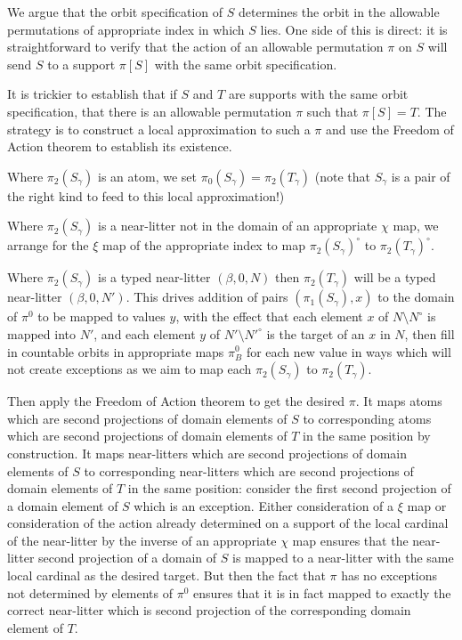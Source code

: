 \documentclass[12pt]{article}
\begin{document}
We argue that the orbit specification of $S$ determines the orbit in the allowable permutations of appropriate index in which $S$ lies.  One side of this is direct:  it is straightforward to verify that the action of an allowable permutation $\pi$ on $S$ will send $S$ to a support $\pi[S]$ with the same orbit specification.

It is trickier to establish that if $S$ and $T$ are supports with the same orbit specification, that there is an allowable permutation $\pi$ such that $\pi[S]=T$.  The strategy is to construct a local approximation to such a $\pi$ and use the Freedom of Action theorem to establish its existence.

Where $\pi_2(S_\gamma)$ is an atom, we set $\pi_0(S_\gamma) = \pi_2(T_\gamma)$ (note that $S_\gamma$ is a pair of the right kind to feed to this local approximation!)

Where  $\pi_2(S_\gamma)$ is a near-litter not in the domain of an appropriate $\chi$ map, we arrange for the $\xi$ map of the appropriate index to map $\pi_2(S_\gamma)^\circ$ to $\pi_2(T_\gamma)^\circ$.

Where $\pi_2(S_\gamma)$ is a typed near-litter $(\beta,0,N)$ then $\pi_2(T_\gamma)$ will be a typed near-litter $(\beta,0,N')$.  This drives addition of pairs $(\pi_1(S_\gamma),x)$ to the domain of $\pi^0$ to be mapped to values $y$,
with the effect that each element $x$ of $N \setminus N^\circ$ is mapped into $N'$, and each element $y$
of $N'\setminus N'^\circ$ is the target of an $x$ in $N$, then fill in countable orbits in appropriate maps $\pi^0_B$ for each new value in ways which will not create exceptions as we aim to map each $\pi_2(S_\gamma)$ to $\pi_2(T_\gamma)$.

Then apply the Freedom of Action theorem to get the desired $\pi$.  It maps atoms which are second projections of domain elements of $S$ to corresponding atoms which are second projections of domain elements of $T$ in the same position by construction.
It maps near-litters which are second projections of domain elements of $S$ to corresponding near-litters which are second projections of domain elements of $T$ in the same position:  consider the first second projection of a domain element of $S$ which is an exception.  Either consideration of a $\xi$ map or consideration of the action already determined on a support
of the local cardinal of the near-litter by the inverse of an appropriate $\chi$ map ensures that the near-litter second projection of a domain of $S$ is mapped to a near-litter with the same local cardinal as the desired target.  But then the fact
that $\pi$ has no exceptions not determined by elements of $\pi^0$ ensures that it is in fact mapped to exactly the correct near-litter which is second projection of the corresponding domain element of $T$.
\end{document}
